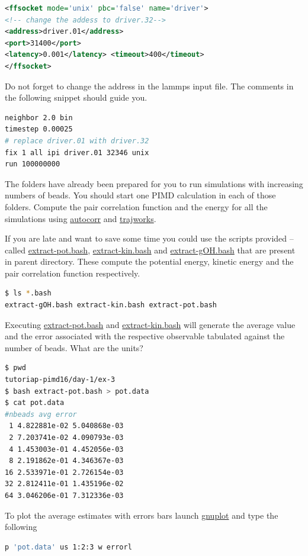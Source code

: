 \documentclass{article}
\begin{document}
\begin{Exercise}[label={water},title={Benchmark of quantum effects in a water molecule}]
\begin{lstlisting}[language=xml]
<ffsocket mode='unix' pbc='false' name='driver'>
<!-- change the addess to driver.32--> 
<address>driver.01</address>
<port>31400</port>
<latency>0.001</latency> <timeout>400</timeout>
</ffsocket>
\end{lstlisting}

\Question
Do not forget to change the address in the lammps input file. 
The comments in the following snippet should guide you.
\begin{lstlisting}[language=sh]
neighbor 2.0 bin
timestep 0.00025
# replace driver.01 with driver.32
fix 1 all ipi driver.01 32346 unix
run 100000000
\end{lstlisting}

\Question
The folders  have already been prepared for you to run simulations with 
increasing numbers of beads. You should start one PIMD calculation in each of those folders.
Compute the pair correlation function and the energy for all the simulations using \url{autocorr} and \url{trajworks}.


\Question
If you are late and want to save some time you could use the scripts provided -- 
called \url{extract-pot.bash}, \url{extract-kin.bash} and \url{extract-gOH.bash} 
that are present in parent directory. These compute the potential energy, 
kinetic energy and the pair correlation function respectively. 
\begin{lstlisting}[language=bash]
$ ls *.bash  
extract-gOH.bash extract-kin.bash extract-pot.bash
\end{lstlisting}


\Question
Executing \url{extract-pot.bash} and \url{extract-kin.bash} will generate the average value and the error associated with the respective observable tabulated against the number of beads. What are the units? 
\begin{lstlisting}[language=bash]
$ pwd
tutoriap-pimd16/day-1/ex-3
$ bash extract-pot.bash > pot.data
$ cat pot.data
#nbeads avg error
 1 4.822881e-02 5.040868e-03
 2 7.203741e-02 4.090793e-03
 4 1.453003e-01 4.452056e-03
 8 2.191862e-01 4.346367e-03
16 2.533971e-01 2.726154e-03
32 2.812411e-01 1.435196e-02
64 3.046206e-01 7.312336e-03
\end{lstlisting}
To plot the average estimates with errors bars launch \url{gnuplot} and type the following
\begin{lstlisting}[language=bash]
p 'pot.data' us 1:2:3 w errorl
\end{lstlisting}


\end{Exercise}
\end{document}
